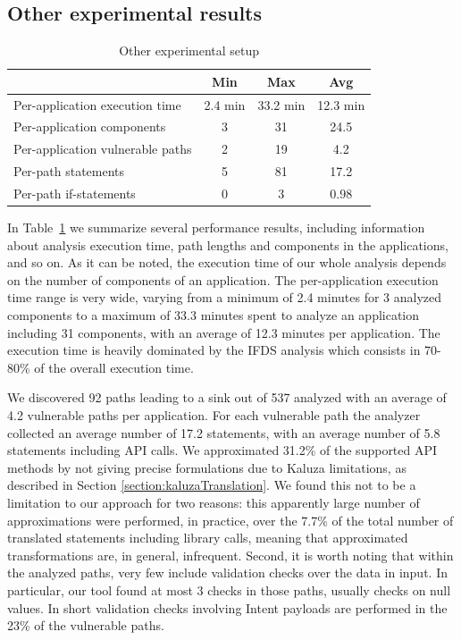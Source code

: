 \subsection{Other experimental results}

\begin{table}[t]
\small
  \centering
  \begin{tabular}{|l|c|c|c|}
    \hline
    & Min & Max & Avg \\ \hline
    Per-application execution time & 2.4 min & 33.2 min & 12.3 min \\
    Per-application components & 3 & 31 & 24.5 \\
    Per-application vulnerable paths & 2 & 19 & 4.2 \\
    Per-path statements & 5 & 81 & 17.2 \\
    Per-path if-statements & 0 & 3 & 0.98 \\
    \hline
  \end{tabular}
  \caption{Other experimental setup}
  \label{table:other_experimental}
\end{table}

In Table~\ref{table:other_experimental} we summarize several performance results, including information about analysis execution time, path lengths and components in the applications, and so on. As it can be noted, the execution time of our whole analysis depends on the number of components of an application. The per-application
execution time range is very wide, varying from a minimum of 2.4 minutes for 3 analyzed components to a maximum of 33.3 minutes spent to analyze an
application including 31 components, with an average of 12.3 minutes per application. The execution time is heavily dominated by the IFDS analysis which consists in 70-80\% of the overall execution time.

We discovered 92 paths leading to a sink out of 537 analyzed with an average of 4.2 vulnerable paths per application. For each vulnerable path the analyzer collected an average number of 17.2 statements, with an average number of 5.8 statements including API calls. We approximated 31.2\% of the supported API methods by not giving precise formulations due to Kaluza limitations, as described in Section \ref{section:kaluzaTranslation}. We found this not to be a limitation to our approach for two reasons: this apparently large number of approximations were performed, in practice, over the 7.7\% of the total number of translated statements including library calls, meaning that approximated transformations are, in general, infrequent.
Second, it is worth noting that within the analyzed paths, very few include validation checks over the data in input. In particular, our tool found at most 3 checks in those paths, usually checks on null values. In short validation checks involving Intent payloads are performed in the 23\% of the vulnerable paths.

